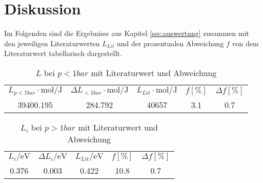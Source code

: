 \section{Diskussion}
\label{sec:Diskussion}
Im Folgenden sind die Ergebnisse aus Kapitel \ref{sec:auswertung} zusammen mit den jeweiligen Literaturwerten
$L_{Lit}$ und der prozentualen Abweichung $f$ von dem Literaturwert tabellarisch dargestellt.
\begin{table}[H]
  \centering
      \caption{$L$ bei $p<1bar$ mit Literaturwert und Abweichung}
      \begin{tabular}{S S S S S}
        \toprule
        {$ L_{p<1bar} \cdot \si{\mole\per\joule}$} & {$ \Delta L_{<1bar} \cdot \si{\mole\per\joule}$} & {$ L_{Lit} \cdot \si{\mole\per\joule}$} & {$f [\%]$} & {$\Delta f [\%]$}\\
        39400.195 & 284.792 & 40657 & 3.1 & 0.7\\
        \bottomrule
      \end{tabular}
    \end{table}
\begin{table}[H]
  \centering
      \caption{$L_{i}$ bei $p>1bar$ mit Literaturwert und Abweichung}
      \begin{tabular}{S S S S S}
        \toprule
        {$ L_{i} / \si{\electronvolt}$} & {$ \Delta L_{i} / \si{\electronvolt}$} & {$ L_{Lit} / \si{\electronvolt}$} & {$f [\%]$} & {$\Delta f [\%]$}\\
        0.376 & 0.003 & 0.422 & 10.8 & 0.7\\
        \bottomrule
      \end{tabular}
    \end{table}

